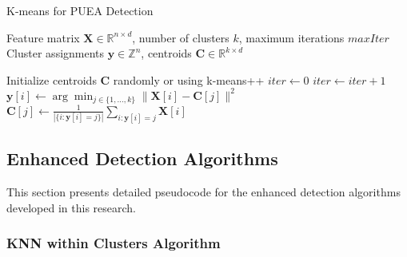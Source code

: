 \begin{algorithm}[H]
\caption{K-means for PUEA Detection}
\label{alg:kmeans_full}
\begin{algorithmic}[1]
\Require Feature matrix $\mathbf{X} \in \mathbb{R}^{n \times d}$, number of clusters $k$, maximum iterations $maxIter$
\Ensure Cluster assignments $\mathbf{y} \in \mathbb{Z}^n$, centroids $\mathbf{C} \in \mathbb{R}^{k \times d}$

\State Initialize centroids $\mathbf{C}$ randomly or using k-means++
\State $iter \gets 0$
\Repeat
    \State $iter \gets iter + 1$
        \State $\mathbf{y}[i] \gets \arg\min_{j \in \{1,\ldots,k\}} \|\mathbf{X}[i] - \mathbf{C}[j]\|^2$
    \EndFor
        \State $\mathbf{C}[j] \gets \frac{1}{|\{i: \mathbf{y}[i] = j\}|} \sum_{i: \mathbf{y}[i] = j} \mathbf{X}[i]$
    \EndFor
{}
\end{algorithmic}
\end{algorithm}

\subsection{Enhanced Detection Algorithms}
\label{app:enhanced_pseudocode}

This section presents detailed pseudocode for the enhanced detection algorithms developed in this research.

\subsubsection{KNN within Clusters Algorithm}


